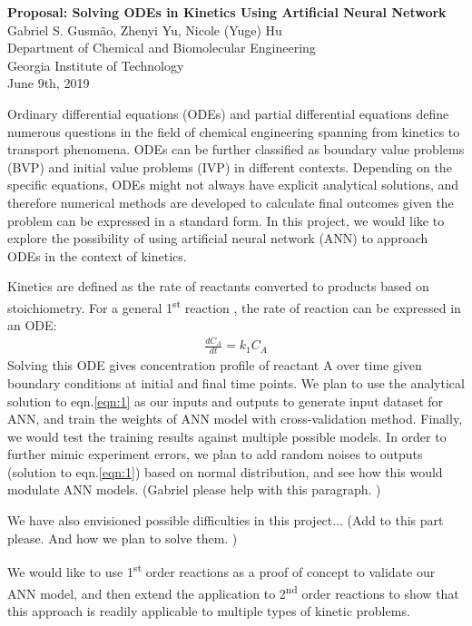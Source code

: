 \documentclass[12pt, letterpaper]{article}
\begin{document}
\begin{center}
    \Large \textbf{Proposal: Solving ODEs in Kinetics Using Artificial Neural Network \\}
    \vspace{0.5em}
    \normalsize Gabriel S. Gusm\~{a}o\textsuperscript{\textdagger}, Zhenyi Yu\textsuperscript{\textdagger}, Nicole (Yuge) Hu\textsuperscript{\textdagger}\\ 
    \vspace{0.2em}
    \textsuperscript{\textdagger}Department of Chemical and Biomolecular Engineering \\ Georgia Institute of Technology \\
    \vspace{0.2em}
    June 9th, 2019 \\
\end{center}

Ordinary differential equations (ODEs) and partial differential equations define numerous questions in the field of chemical engineering spanning from kinetics to transport phenomena. ODEs can be further classified as boundary value problems (BVP) and initial value problems (IVP) in different contexts. Depending on the specific equations, ODEs might not always have explicit analytical solutions, and therefore numerical methods are developed to calculate final outcomes given the problem can be expressed in a standard form. In this project, we would like to explore the possibility of using artificial neural network (ANN) to approach ODEs in the context of kinetics. 

Kinetics are defined as the rate of reactants converted to products based on stoichiometry. For a general 1\textsuperscript{st} reaction , the rate of reaction can be expressed in an ODE: 
\begin{align}
    \frac{dC_A}{dt} = k_1 C_A
    \label{eqn:1}
\end{align}
Solving this ODE gives concentration profile of reactant A over time given boundary conditions at initial and final time points. We plan to use the analytical solution to eqn.\ref{eqn:1} as our inputs and outputs to generate input dataset for ANN, and train the weights of ANN model with cross-validation method. Finally, we would test the training results against multiple possible models. In order to further mimic experiment errors, we plan to add random noises to outputs (solution to eqn.\ref{eqn:1}) based on normal distribution, and see how this would modulate ANN models. (Gabriel please help with this paragraph. )

We have also envisioned possible difficulties in this project... (Add to this part please. And how we plan to solve them. )

We would like to use 1\textsuperscript{st} order reactions as a proof of concept to validate our ANN model, and then extend the application to 2\textsuperscript{nd} order reactions to show that this approach is readily applicable to multiple types of kinetic problems. 


\end{document}
